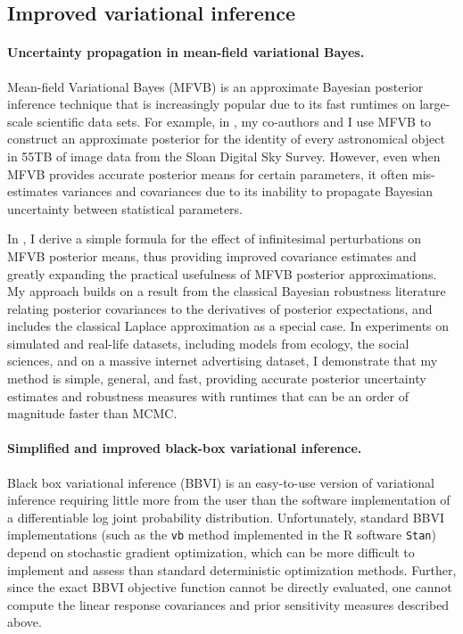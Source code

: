
\subsection{Improved variational inference}

\paragraph{Uncertainty propagation in mean-field variational Bayes.}
%
Mean-field Variational Bayes (MFVB) is an approximate Bayesian posterior
inference technique that is increasingly popular due to its fast runtimes on
large-scale scientific data sets. For example, in
\citet{regier:2019:cataloging}, my co-authors and I use MFVB to construct an
approximate posterior for the identity of every astronomical object in 55TB
of image data from the Sloan Digital Sky Survey.  However, even when MFVB provides
accurate posterior means for certain parameters, it often mis-estimates
variances and covariances due to its inability to propagate Bayesian uncertainty
between statistical parameters.

In \citet{giordano:2015:linear, giordano:2018:covariances}, I derive a simple
formula for the effect of infinitesimal perturbations on MFVB posterior means,
thus providing improved covariance estimates and greatly expanding the practical
usefulness of MFVB posterior approximations. My approach builds on a result from
the classical Bayesian robustness literature relating posterior covariances to
the derivatives of posterior expectations, and includes the classical Laplace
approximation as a special case. In experiments on simulated and real-life
datasets,  including models from ecology, the social sciences, and on a massive
internet advertising dataset, I demonstrate that my method is simple, general,
and fast, providing accurate posterior uncertainty estimates and robustness
measures with runtimes that can be an order of magnitude faster than MCMC.


\paragraph{Simplified and improved black-box variational inference.}
%
Black box variational inference (BBVI) is an easy-to-use version of variational
inference requiring little more from the user than the software implementation
of a differentiable log joint probability distribution. Unfortunately, standard
BBVI implementations (such as the \texttt{vb} method implemented in the R
software \texttt{Stan}) depend on stochastic gradient optimization, which can be
more difficult to implement and assess than standard deterministic optimization
methods.  Further, since the exact BBVI objective function cannot be directly
evaluated, one cannot compute the linear response covariances and prior
sensitivity measures described above.

